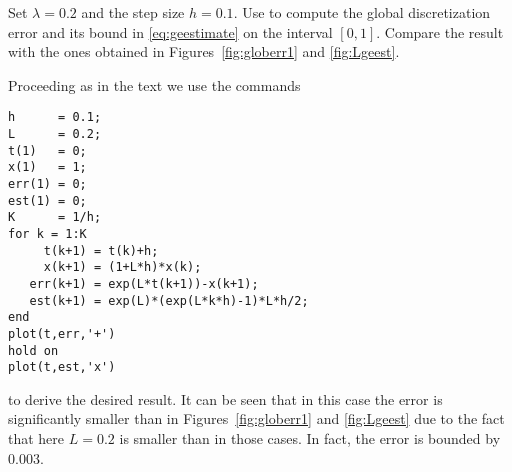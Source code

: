 \documentclass{ximera}
\begin{document}
\begin{computerExercise} \label{c15.3.3}
Set $\lambda=0.2$ and the step size $h=0.1$.  Use \Matlab to compute 
the global discretization error and its bound in \eqref{eq:geestimate}
on the interval $[0,1]$.  Compare the result with the ones obtained 
in Figures~\ref{fig:globerr1} and \ref{fig:Lgeest}.

\begin{solution}

Proceeding as in the text we use the \Matlab commands
\begin{verbatim}
h      = 0.1;
L      = 0.2;
t(1)   = 0;
x(1)   = 1;
err(1) = 0;
est(1) = 0;
K      = 1/h;
for k = 1:K
     t(k+1) = t(k)+h;
     x(k+1) = (1+L*h)*x(k);
   err(k+1) = exp(L*t(k+1))-x(k+1);
   est(k+1) = exp(L)*(exp(L*k*h)-1)*L*h/2;
end
plot(t,err,'+')
hold on
plot(t,est,'x')
\end{verbatim}
to derive the desired result.  It can be seen that in this case
the error is significantly smaller than in Figures~\ref{fig:globerr1}
and \ref{fig:Lgeest} due to the fact that here $L=0.2$ is smaller
than in those cases.  In fact, the error is bounded by $0.003$.





\end{solution}
\end{computerExercise}
\end{document}
